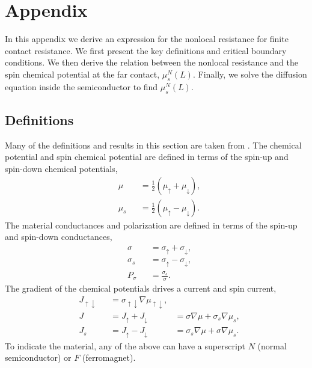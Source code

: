 \section{Appendix}

In this appendix we derive an expression for
the nonlocal resistance for finite contact resistance.
We first present the key definitions and critical boundary conditions.
We then derive the relation between the nonlocal resistance
and the spin chemical potential at the far contact, $μ_s^N (L)$.
Finally, we solve the diffusion equation
inside the semiconductor to find $μ_s^N (L)$.

\subsection{Definitions}

Many of the definitions and results in this section are taken from
\cite{ActaPhysicaSlovaca.57.4_5.565-907}.
The chemical potential and spin chemical potential are defined in terms
of the spin-up and spin-down chemical potentials,
\begin{subequations}\label{eq:potentials}
  \begin{alignat}{2}
    & μ   && = \frac{1}{2} \left( μ_↑ + μ_↓ \right), \\
    & μ_s && = \frac{1}{2} \left( μ_↑ - μ_↓ \right).
  \end{alignat}
\end{subequations}
The material conductances and polarization are defined in terms
of the spin-up and spin-down conductances,
\begin{subequations}\label{eq:conductances}
  \begin{alignat}{2}
    & σ   && = σ_↑ + σ_↓, \\
    & σ_s && = σ_↑ - σ_↓,
    \\
    \label{eq:material.polarization}
    & P_σ && = \frac{σ_s}{σ}.
  \end{alignat}
\end{subequations}
The gradient of the chemical potentials drives a current and spin current,
\begin{subequations}\label{eq:currents}
  \begin{alignat}{3}
    & J_{↑↓} && = σ_{↑↓} ∇μ_{↑↓},
    \\
    \label{eq:currents.current}
    & J      && = J_↑ + J_↓ & = σ   ∇μ + σ_s ∇μ_s,
    \\
    \label{eq:currents.spincurrent}
    & J_s    && = J_↑ - J_↓ & = σ_s ∇μ + σ   ∇μ_s.
  \end{alignat}
\end{subequations}
To indicate the material, any of the above can have a superscript
$N$ (normal semiconductor) or $F$ (ferromagnet).

